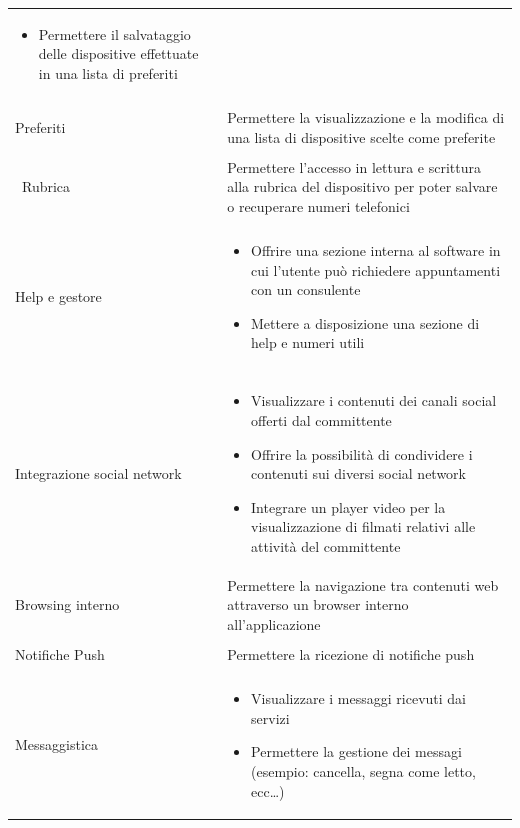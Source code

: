 \begin{center}
\begin{longtable}{p{6cm}|p{8cm}}
\begin{itemize}
                                        \item Permettere il salvataggio delle dispositive effettuate in una lista di preferiti
                                       \end{itemize}\\\\
    Preferiti & Permettere la visualizzazione e la modifica di una lista di dispositive scelte come preferite\\\\\
    Rubrica & Permettere l'accesso in lettura e scrittura alla rubrica del dispositivo per poter salvare o recuperare numeri telefonici\\\\
    
    Help e gestore & \begin{itemize}
                      \item Offrire una sezione interna al software in cui l'utente può richiedere appuntamenti con un consulente
                      \item Mettere a disposizione una sezione di help e numeri utili
                     \end{itemize}\\\\

    Integrazione social network & \begin{itemize}
                                   \item Visualizzare i contenuti dei canali social offerti dal committente
                                   \item Offrire la possibilità di condividere i contenuti sui diversi social network
				   \item Integrare un player video per la visualizzazione di filmati relativi alle attività del committente
                                  \end{itemize}\\
     Browsing interno & Permettere la navigazione tra contenuti web attraverso un browser interno all'applicazione\\\\
     Notifiche Push & Permettere la ricezione di notifiche push\\\\
     Messaggistica		 & \begin{itemize}
                                   \item Visualizzare i messaggi ricevuti dai servizi
                                   \item Permettere la gestione dei messagi (esempio: cancella, segna come letto, ecc\dots)
                                  \end{itemize}\\
    \bottomrule

    \end{longtable}
\end{center}


